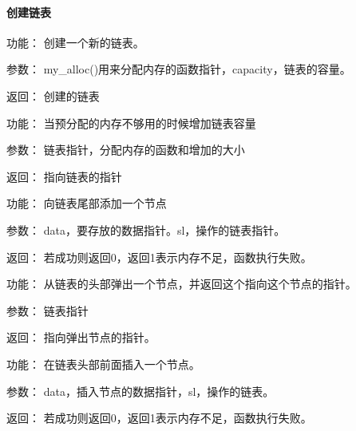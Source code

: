 \paragraph{创建链表}
	\begin{compactdesc}
	\item[功能：]创建一个新的链表。
	\item[参数：]my\_alloc()用来分配内存的函数指针，capacity，链表的容量。
	\item[返回：]创建的链表
	\end{compactdesc}
	\begin{compactdesc}
	\item[功能：]当预分配的内存不够用的时候增加链表容量
	\item[参数：]链表指针，分配内存的函数和增加的大小
	\item[返回：]指向链表的指针
	\end{compactdesc}
	\begin{compactdesc}
	\item[功能：]向链表尾部添加一个节点
	\item[参数：]data，要存放的数据指针。sl，操作的链表指针。
	\item[返回：]若成功则返回0，返回1表示内存不足，函数执行失败。
	\end{compactdesc}
	\begin{compactdesc}
	\item[功能：]从链表的头部弹出一个节点，并返回这个指向这个节点的指针。
	\item[参数：]链表指针
	\item[返回：]指向弹出节点的指针。
	\end{compactdesc}
	\begin{compactdesc}
	\item[功能：]在链表头部前面插入一个节点。
	\item[参数：]data，插入节点的数据指针，sl，操作的链表。
	\item[返回：]若成功则返回0，返回1表示内存不足，函数执行失败。
	\end{compactdesc}
